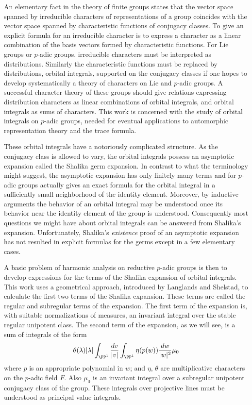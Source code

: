 \documentclass{memo-l}
\theoremstyle{definition}
\theoremstyle{remark}
\numberwithin{section}{chapter}
\numberwithin{equation}{chapter}
\begin{document}
An elementary fact in the theory of finite groups states that the vector
space spanned by irreducible characters of representations of a group coincides
with the vector space spanned by characteristic functions of conjugacy classes.
To give an explicit formula for an irreducible character is to express a character
as a linear combination of the basis vectors formed by characteristic functions.
For Lie groups or $p$-adic groups, irreducible characters must be interpreted
as distributions.  Similarly the characteristic functions must be replaced by
distributions, orbital integrals,  supported on the conjugacy classes if one
hopes to develop systematically a theory of characters on Lie and $p$-adic groups.
A successful character theory of these groups should give relations expressing
distribution characters as linear combinations of orbital integrals, and
orbital integrals as sums of characters.  This work is concerned
with the study of orbital integrals on $p$-adic groups, needed for eventual applications
to automorphic representation theory and the trace formula.

These orbital integrals have a notoriously complicated structure.  As
the conjugacy class is allowed to vary, the orbital integrals possess
an asymptotic expansion called the Shalika germ expansion.  In
contrast to what the terminology might suggest, the asymptotic
expansion has only finitely many terms and for $p$-adic groups
actually gives an exact formula for the orbital integral in a
sufficiently small neighborhood of the identity element.  Moreover, by
inductive arguments the behavior of an orbital integral may be
understood once its behavior near the identity element of the group is
understood.  Consequently most questions we might have about orbital
integrals can be answered from Shalika's expansion.  Unfortunately,
Shalika's {\it existence} proof of an asymptotic expansion has not
resulted in explicit formulas for the germs except in a few elementary
cases.

A basic problem of harmonic analysis on reductive $p$-adic groups is
then to develop expressions for the terms of the Shalika expansion of
orbital integrals.  This work uses a geometrical approach, introduced
by Langlands and Shelstad, to calculate the first two terms of the
Shalika expansion.  These terms are called the regular and subregular
terms of the expansion.  The first term of the expansion is, with
suitable normalizations of measures, an invariant integral over the
stable regular unipotent class.  The second term of the expansion, as
we will see, is a sum of integrals of the form
\[
 \theta(\lambda)|\lambda|\int_{\PP^1} {\frac {dv}{|v|}}
\int_{\PP^1}\eta(p(w))\frac {dw}{|w|^2} \mu_0
\]
where $p$ is an appropriate polynomial in $w$; and $\eta$, $\theta$
are multiplicative characters on the $p$-adic field $F$. Also $\mu_0$
is an invariant integral over a subregular unipotent conjugacy class
of the group.  These integrals over projective lines must be
understood as principal value integrals.
\end{document}
